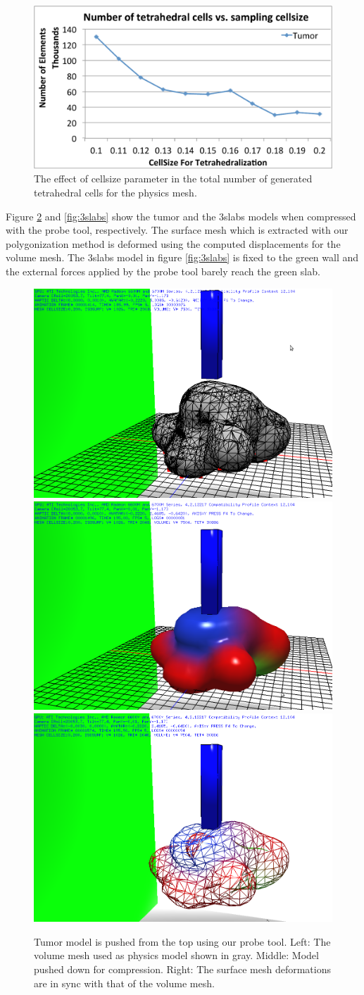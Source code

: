 \begin{figure}[H]
  \centering
  \includegraphics[width=0.8 \linewidth]{figures/deformable/cellsize_elements.pdf}
  \caption{\label{fig:cellsize_elements}
  {The effect of cellsize parameter in the total number of generated tetrahedral cells for the physics mesh.}
}
\end{figure}

Figure \ref{fig:tumor} and \ref{fig:3slabs} show the tumor and the 3slabs models when compressed with 
the probe tool, respectively. The surface mesh which is extracted with our polygonization method is 
deformed using the computed displacements for the volume mesh. The 3slabs model 
in figure \ref{fig:3slabs} is fixed to the green wall and the external forces applied by the probe tool 
barely reach the green slab. 

\begin{figure}[H]
  \centering
  \includegraphics[width=0.30\linewidth]{figures/deformable/shots/tumor01.png}
  \includegraphics[width=0.30\linewidth]{figures/deformable/shots/tumor02.png}
  \includegraphics[width=0.30\linewidth]{figures/deformable/shots/tumor03.png}
 
  \caption{\label{fig:tumor}
  {Tumor model is pushed from the top using our probe tool. Left: The volume mesh used as physics 
  model shown in gray. Middle: Model pushed down for compression. Right: The surface mesh deformations
  are in sync with that of the volume mesh.}
}
\end{figure}


